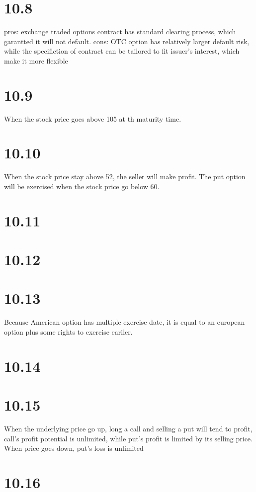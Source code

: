 \documentclass[12pt]{article}%
\begin{document}
\section*{10.8}
pros: exchange traded options contract has standard clearing process, 
which garantted it will not default. 
cons: OTC option has relatively larger default risk, while the specifiction
of contract can be tailored to fit issuer's interest, which make it more
flexible

\section*{10.9}
When the stock price goes above 105 at th maturity time.

\section*{10.10}
When the stock price stay above 52, the seller will make profit. 
The put option will be exercised when the stock price go below 60.

\section*{10.11}

\section*{10.12}

\section*{10.13}
Because American option has multiple exercise date, it is equal to an 
european option plus some rights to exercise eariler.

\section*{10.14}
 

\section*{10.15}
When the underlying price go up, long a call and selling a put will 
tend to profit, call's profit potential is unlimited, while put's profit is 
limited by its selling price. When price goes down, put's loss is unlimited

\section*{10.16}
\end{document}
